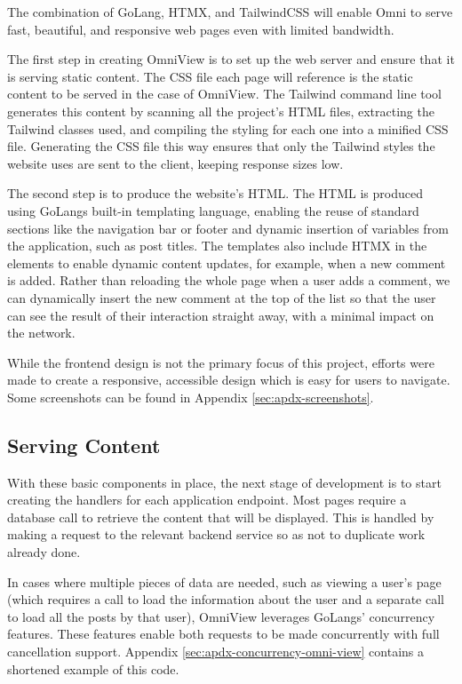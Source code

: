 The combination of GoLang, HTMX, and TailwindCSS will enable Omni to serve fast, beautiful, and responsive web pages even with limited bandwidth. 

The first step in creating OmniView is to set up the web server and ensure that it is serving static content.
The CSS file each page will reference is the static content to be served in the case of OmniView.
The Tailwind command line tool generates this content by scanning all the project's HTML files, extracting the Tailwind classes used, and compiling the styling for each one into a minified CSS file.
Generating the CSS file this way ensures that only the Tailwind styles the website uses are sent to the client, keeping response sizes low.

The second step is to produce the website's HTML.
The HTML is produced using GoLangs built-in templating language, enabling the reuse of standard sections like the navigation bar or footer and dynamic insertion of variables from the application, such as post titles.
The templates also include HTMX in the elements to enable dynamic content updates, for example, when a new comment is added.
Rather than reloading the whole page when a user adds a comment, we can dynamically insert the new comment at the top of the list so that the user can see the result of their interaction straight away, with a minimal impact on the network.

While the frontend design is not the primary focus of this project, efforts were made to create a responsive, accessible design which is easy for users to navigate.
Some screenshots can be found in Appendix \ref{sec:apdx-screenshots}.

\subsection{Serving Content}
With these basic components in place, the next stage of development is to start creating the handlers for each application endpoint.
Most pages require a database call to retrieve the content that will be displayed. This is handled by making a request to the relevant backend service so as not to duplicate work already done. 

In cases where multiple pieces of data are needed, such as viewing a user's page (which requires a call to load the information about the user and a separate call to load all the posts by that user), OmniView leverages GoLangs' concurrency features.
These features enable both requests to be made concurrently with full cancellation support.
Appendix \ref{sec:apdx-concurrency-omni-view} contains a shortened example of this code.

